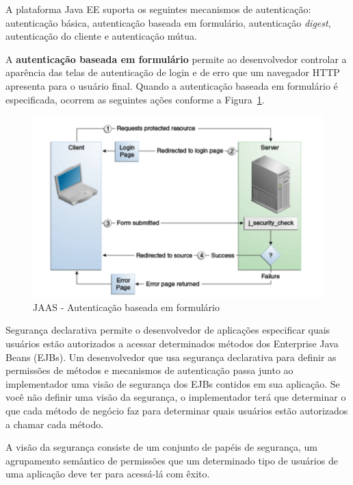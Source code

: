 A plataforma Java EE suporta os seguintes mecanismos de autenticação: autenticação básica, autenticação baseada em formulário, autenticação \textit{digest}, autenticação do cliente e autenticação mútua.

A \textbf{autenticação baseada em formulário} permite ao desenvolvedor controlar a aparência das telas de autenticação de login e de erro que um navegador HTTP apresenta para o usuário final. Quando a autenticação baseada em formulário é especificada, ocorrem as seguintes ações conforme a Figura~\ref{fig-referencial-jaas-method-form}.

\begin{figure}[h]
	\centering
	\includegraphics[width=1\textwidth]{figuras/referencial/fig-referencial-jaas-method-form}
	\caption{JAAS - Autenticação baseada em formulário~\cite{oracleJAAS}}
	\label{fig-referencial-jaas-method-form}
\end{figure}



Segurança declarativa permite o desenvolvedor de aplicações especificar quais usuários estão autorizados a acessar determinados métodos dos Enterprise Java Beans (EJBs). Um desenvolvedor que usa segurança declarativa para definir as permissões de métodos e mecanismos de autenticação passa junto ao implementador uma visão de segurança dos EJBs contidos em sua aplicação. Se você não definir uma visão da segurança, o implementador terá que determinar o que cada método de negócio faz para determinar quais usuários estão autorizados a chamar cada método.

A visão da segurança consiste de um conjunto de papéis de segurança, um agrupamento semântico de permissões que um determinado tipo de usuários de uma aplicação deve ter para acessá-lá com êxito. 

